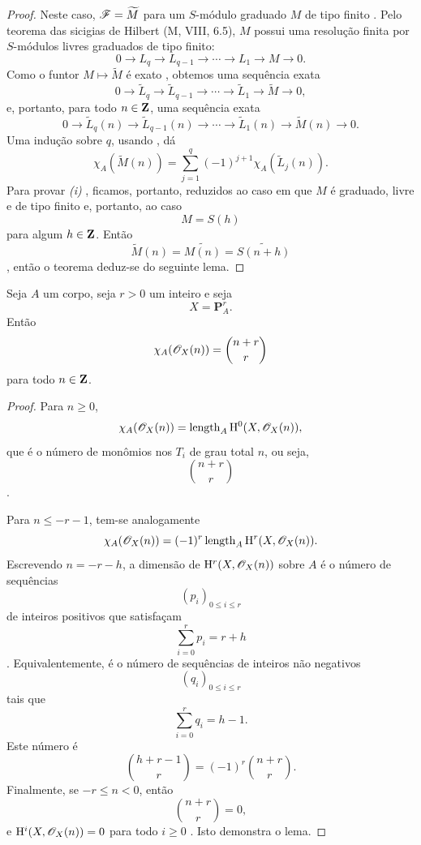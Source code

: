 \begin{proof}
Neste caso, $\mathscr{F}=\widetilde{M}$ para um $S$-módulo graduado $M$ de tipo finito .
Pelo teorema das sicigias de Hilbert (M, VIII, 6.5), $M$ possui uma resolução finita por $S$-módulos livres graduados de tipo finito:
\[
  0\longrightarrow L_q
  \longrightarrow L_{q-1}
  \longrightarrow\cdots
  \longrightarrow L_1
  \longrightarrow M
  \longrightarrow0.
\]
Como o funtor $M\mapsto\widetilde{M}$ é exato , obtemos uma sequência exata
\[
  0\longrightarrow\widetilde{L}_q
  \longrightarrow\widetilde{L}_{q-1}
  \longrightarrow\cdots
  \longrightarrow\widetilde{L}_1
  \longrightarrow\widetilde{M}
  \longrightarrow0,
\]
e, portanto, para todo $n\in\mathbf Z$, uma sequência exata
\[
  0\longrightarrow\widetilde{L}_q(n)
  \longrightarrow\widetilde{L}_{q-1}(n)
  \longrightarrow\cdots
  \longrightarrow\widetilde{L}_1(n)
  \longrightarrow\widetilde{M}(n)
  \longrightarrow0.
\]
Uma indução sobre $q$, usando , dá
\[
  \chi_A(\widetilde{M}(n))
  =
  \sum_{j=1}^{q}
  (-1)^{j+1}\chi_A(\widetilde{L}_j(n)).
\]
Para provar \emph{(i) }, ficamos, portanto, reduzidos ao caso em que $M$ é graduado, livre e de tipo finito e, portanto, ao caso
\[
  M=S(h)
\]
para algum $h\in\mathbf Z$.
Então
\[
  \widetilde{M}(n)
  =
  \widetilde{M(n)}
  =
  \widetilde{S(n+h)}
\]
, então o teorema deduz-se do seguinte lema.
\end{proof}

\begin{lemma}[2.5.3.1]
\label{III.2.5.3.1}
Seja $A$ um corpo, seja $r>0$ um inteiro e seja
\[
  X=\mathbf{P}_A^r.
\]
Então
\[
  \chi_A(\mathscr{O}_X(n))
  =
  \binom{n+r}{r}
\]
para todo $n\in\mathbf Z$.
\end{lemma}

\begin{proof}
Para $n\geq0$,
\[
  \chi_A(\mathscr{O}_X(n))
  =
  \operatorname{length}_A\mathrm{H}^0(X,\mathscr{O}_X(n)),
\]
que é o número de monômios nos $T_i$ de grau total $n$, ou seja,
\[
  \binom{n+r}{r}
\]
.

Para $n\leq-r-1$, tem-se analogamente
\[
  \chi_A(\mathscr{O}_X(n))
  =
  (-1)^r\operatorname{length}_A\mathrm{H}^r(X,\mathscr{O}_X(n)).
\]
Escrevendo $n=-r-h$, a dimensão de $\mathrm{H}^r(X,\mathscr{O}_X(n))$ sobre $A$ é o número de sequências
\[
  (p_i)_{0\leq i\leq r}
\]
de inteiros positivos que satisfaçam
\[
  \sum_{i=0}^{r}p_i=r+h
\]
.
Equivalentemente, é o número de sequências de inteiros não negativos
\[
  (q_i)_{0\leq i\leq r}
\]
tais que
\[
  \sum_{i=0}^{r}q_i=h-1.
\]
Este número é
\[
  \binom{h+r-1}{r}
  =
  (-1)^r\binom{n+r}{r}.
\]
Finalmente, se $-r\leq n<0$, então
\[
  \binom{n+r}{r}=0,
\]
e $\mathrm{H}^i(X,\mathscr{O}_X(n))=0$ para todo $i\geq0$ .
Isto demonstra o lema.
\end{proof}

